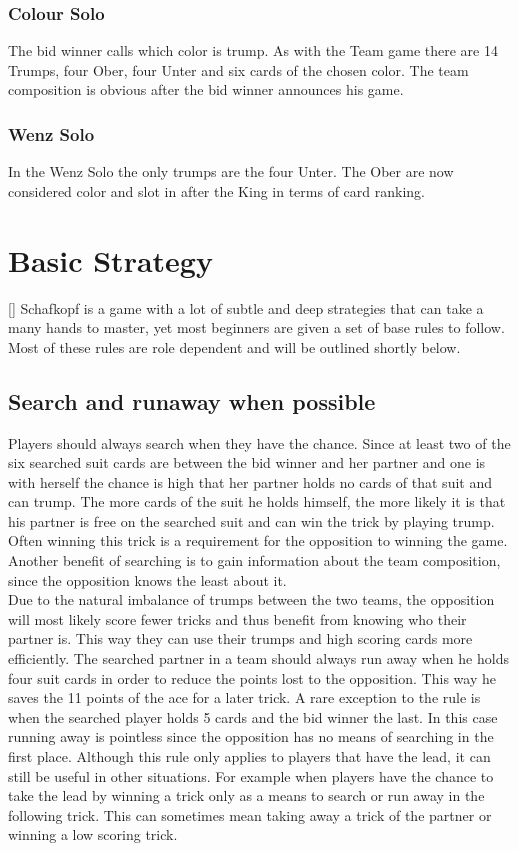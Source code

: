 \subsubsection{Colour Solo}
The bid winner calls which color is trump.
As with the Team game there are 14 Trumps, four Ober, four Unter and six cards of the chosen color.
The team composition is obvious after the bid winner announces his game.

\subsubsection{Wenz Solo}
In the Wenz Solo the only trumps are the four Unter.
The Ober are now considered color and slot in after the King in terms of card ranking.


\section{Basic Strategy}[\label{basicstrategy}]
Schafkopf is a game with a lot of subtle and deep strategies that can take a many hands to master, yet most beginners
are given a set of base rules to follow.
Most of these rules are role dependent and will be outlined shortly below.

\subsection{Search and runaway when possible}
Players should always search when they have the chance.
Since at least two of the six searched suit cards are between the bid winner and her partner and one is with herself
the chance is high that her partner holds no cards of that suit and can trump.
The more cards of the suit he holds himself, the more likely it is that his partner is free on the searched suit and
can win the trick by playing trump.
Often winning this trick is a requirement for the opposition to winning the game.
Another benefit of searching is to gain information about the team composition, since the opposition knows the least
about it.\\
Due to the natural imbalance of trumps between the two teams, the opposition will most likely score fewer tricks and
thus benefit from knowing who their partner is.
This way they can use their trumps and high scoring cards more efficiently.
\newline
The searched partner in a team should always run away when he holds four suit cards in order to reduce the points lost
to the opposition.
This way he saves the 11 points of the ace for a later trick.
A rare exception to the rule is when the searched player holds 5 cards and the bid winner the last.
In this case running away is pointless since the opposition has no means of searching in the first place.
\newline
Although this rule only applies to players that have the lead, it can still be useful in other situations.
For example when players have the chance to take the lead by winning a trick only as a means to search or run away in
the following trick.
This can sometimes mean taking away a trick of the partner or winning a low scoring trick.

